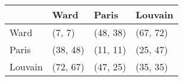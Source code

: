 \begin{tabular}{llll}
\toprule
{} &      Ward &     Paris &   Louvain \\
\midrule
Ward    &    (7, 7) &  (48, 38) &  (67, 72) \\
Paris   &  (38, 48) &  (11, 11) &  (25, 47) \\
Louvain &  (72, 67) &  (47, 25) &  (35, 35) \\
\bottomrule
\end{tabular}
